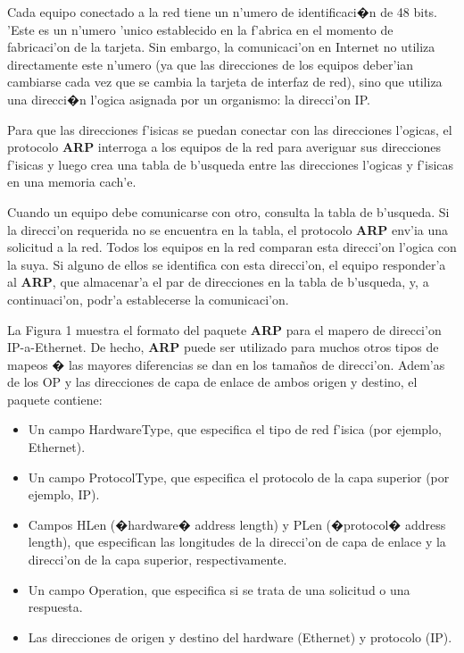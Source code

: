 \documentclass[a4paper,10pt]{article}
\begin{document}
\vspace*{5 mm}
Cada equipo conectado a la red tiene un n'umero de identificaci�n de 48 bits. 'Este es un n'umero 'unico establecido en la f'abrica en el momento de fabricaci'on de la tarjeta. Sin embargo, la comunicaci'on en Internet no utiliza directamente este n'umero (ya que las direcciones de los equipos deber'ian cambiarse cada vez que se cambia la tarjeta de interfaz de red), sino que utiliza una direcci�n l'ogica asignada por un organismo: la direcci'on IP.

\vspace*{5 mm}
Para que las direcciones f'isicas se puedan conectar con las direcciones l'ogicas, el protocolo \textbf{ARP} interroga a los equipos de la red para averiguar sus direcciones f'isicas y luego crea una tabla de b'usqueda entre las direcciones l'ogicas y f'isicas en una memoria cach'e.

\vspace*{5 mm}
Cuando un equipo debe comunicarse con otro, consulta la tabla de b'usqueda. Si la direcci'on requerida no se encuentra en la tabla, el protocolo \textbf{ARP} env'ia una solicitud a la red. Todos los equipos en la red comparan esta direcci'on l'ogica con la suya. Si alguno de ellos se identifica con esta direcci'on, el equipo responder'a al \textbf{ARP}, que almacenar'a el par de direcciones en la tabla de b'usqueda, y, a continuaci'on, podr'a establecerse la comunicaci'on. 

\vspace*{5 mm}
La Figura 1 muestra el formato del paquete \textbf{ARP} para el mapero de direcci'on IP-a-Ethernet. De hecho, \textbf{ARP} puede ser utilizado para muchos otros tipos de mapeos �
las mayores diferencias se dan en los tama\~nos de direcci'on. Adem'as de los OP y las direcciones de capa de enlace de ambos origen y destino, el paquete contiene:

\begin{itemize}
	\item Un campo HardwareType, que especifica el tipo de red f'isica (por ejemplo, Ethernet).
	\item Un campo ProtocolType, que especifica el protocolo de la capa superior (por ejemplo, IP).
	\item Campos HLen (�hardware� address length) y PLen (�protocol� address length), que especifican las longitudes de la direcci'on de capa de enlace y la direcci'on de la capa superior, respectivamente.
	\item Un campo Operation, que especifica si se trata de una solicitud o una respuesta.
	\item Las direcciones de origen y destino del hardware (Ethernet) y protocolo (IP).
\end{itemize}
\end{document}
